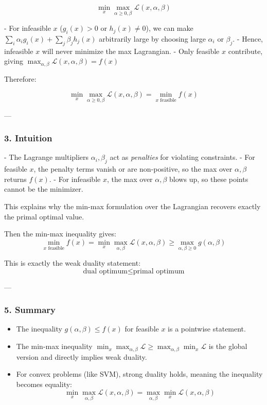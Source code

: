 \[
\min_x \max_{\alpha \ge 0, \beta} \mathcal{L}(x, \alpha, \beta)
\]

- For infeasible \(x\) (\(g_i(x) > 0\) or \(h_j(x) \neq 0\)), we can make \(\sum_i \alpha_i g_i(x) + \sum_j \beta_j h_j(x)\) arbitrarily large by choosing large \(\alpha_i\) or \(\beta_j\).  
- Hence, infeasible \(x\) will never minimize the max Lagrangian.  
- Only feasible \(x\) contribute, giving \(\max_{\alpha,\beta} \mathcal{L}(x,\alpha,\beta) = f(x)\)

Therefore:

\[
\min_x \max_{\alpha \ge 0, \beta} \mathcal{L}(x, \alpha, \beta) = \min_{x \text{ feasible}} f(x)
\]

---

\subsubsection*{3. Intuition}

- The Lagrange multipliers \(\alpha_i, \beta_j\) act as \emph{penalties} for violating constraints.  
- For feasible \(x\), the penalty terms vanish or are non-positive, so the max over \(\alpha,\beta\) returns \(f(x)\).  
- For infeasible \(x\), the max over \(\alpha,\beta\) blows up, so these points cannot be the minimizer.  

This explains why the min-max formulation over the Lagrangian recovers exactly the primal optimal value.

Then the min-max inequality gives:
\[
\min_{x \text{ feasible}} f(x) = \min_x \max_{\alpha,\beta} \mathcal{L}(x,\alpha,\beta) \ge \max_{\alpha,\beta \ge 0} g(\alpha,\beta)
\]

This is exactly the weak duality statement:
\[
\text{dual optimum} \le \text{primal optimum}
\]

---

\subsubsection*{5. Summary}

\begin{itemize}
    \item The inequality \(g(\alpha,\beta) \le f(x)\) for feasible \(x\) is a pointwise statement.  
    \item The min-max inequality \(\min_x \max_{\alpha,\beta} \mathcal{L} \ge \max_{\alpha,\beta} \min_x \mathcal{L}\) is the global version and directly implies weak duality.  
    \item For convex problems (like SVM), strong duality holds, meaning the inequality becomes equality:
    \[
    \min_x \max_{\alpha,\beta} \mathcal{L}(x,\alpha,\beta) = \max_{\alpha,\beta} \min_x \mathcal{L}(x,\alpha,\beta)
    \]
\end{itemize}
